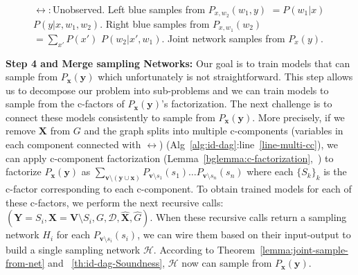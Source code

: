 \documentclass{article}
\newcommand{\h}{\mathcal{H}}
\newcommand{\x}{\mathbf{x}}
\newcommand{\y}{\mathbf{y}}
\newcommand{\X}{\mathbf{X}}
\newcommand{\Xp}{{\hat{\mathbf{X}}}}
\newcommand{\Gp}{{\hat{{G}}}}
\newcommand{\Y}{\mathbf{Y}}
\newcommand{\vb}{\mathbf{v}}
\newcommand{\data}{\mathcal{D}}
\newcommand{\idgen}{\text{ID-GEN}\xspace}
\newcommand{\ydox}{P_{\mathbf{x}}(\mathbf{y})\xspace}
\theoremstyle{plain}
\theoremstyle{definition}
\theoremstyle{remark}
\begin{document}
\begin{figure}
\begin{center}
\begin{subfigure}[c]{0.4\linewidth}
\end{subfigure}
	\end{center}
	\caption{ 
 $\leftrightarrow:$Unobserved.
 Left blue samples from $P_{x,w_2}(w_1,y) $ $= P(w_1|x)$ $P(y|x,w_1,w_2)$. Right blue samples from $P_{x, w_1}(w_2)$ $= \sum_{x'} P(x')$ $P(w_2|x',w_1)$. Joint network samples from $P_x(y)$.}
 \label{fig:main-cyclic}
	\vspace{-3mm}
\end{figure} 
%
\textbf{Step 4 and Merge sampling Networks:}
%
%
Our goal is to train models that can sample from $\ydox$ which unfortunately is not straightforward. This step allows us to decompose our problem into sub-problems and we can train models to sample from the c-factors of $\ydox$'s factorization. The next challenge is to connect these models consistently to sample from $\ydox$.
%
More precisely, if we remove $\X$ from $G$ and the graph splits into multiple c-components (variables in each component connected with $\leftrightarrow$)
(Alg~\ref{alg:id-dag}:line~\ref{line-multi-cc}), 
we can apply c-component factorization (Lemma~\ref{bglemma:c-factorization},~\citep{tian2002general}) to factorize $P_{\x}(\y)$ as ${\textstyle\sum}_{\vb\setminus(\y\cup \x)} 
P_{\vb\setminus s_1}(s_1)  \hdots P_{\vb\setminus s_n}(s_n)$ where each $\{S_k\}_k$ is the c-factor corresponding to each c-component.
To obtain trained models for each of these c-factors, we perform the next recursive calls: \idgen$(\Y=S_{i},\mathbf{X}=\mathbf{V} \setminus S_{i}, G, \data, {\Xp}, \Gp)$. 
When these recursive calls return a sampling network $H_i$ for each $P_{\vb\setminus s_i}(s_i)$, we can wire them based on their input-output to build a single sampling network $\h$. According to Theorem~\ref{lemma:joint-sample-from-net} and ~\ref{th:id-dag-Soundness}, $\h$ now can sample from $P_{\x}(\y)$. 
%
\end{document}
